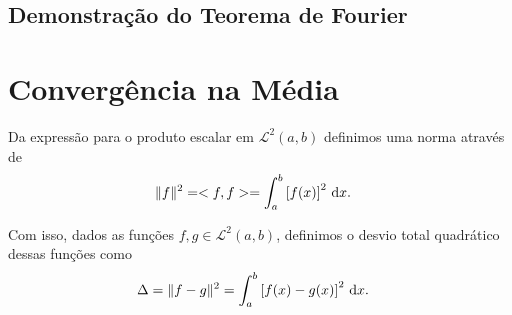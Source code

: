 \subsection{Demonstra\c{c}\~{a}o do Teorema de Fourier}

\section{Converg\^{e}ncia na M\'{e}dia}
Da express\~{a}o para o produto escalar em $\mathcal{L}^2(a, b)$ definimos uma norma atrav\'{e}s de
\begin{align*}
    \| f \|^2 &= <f, f> = \int_a^b \left[ f(x) \right]^2 \, \mathrm{d}x.
\end{align*}

Com isso, dados as fun\c{c}\~{o}es $f, g \in \mathcal{L}^2(a, b)$, definimos o desvio total quadr\'{a}tico dessas fun\c{c}\~{o}es como
\begin{align*}
    \Delta &= \| f - g \|^2 = \int_a^b \left[ f(x) - g(x) \right]^2 \, \mathrm{d}x.
\end{align*}

